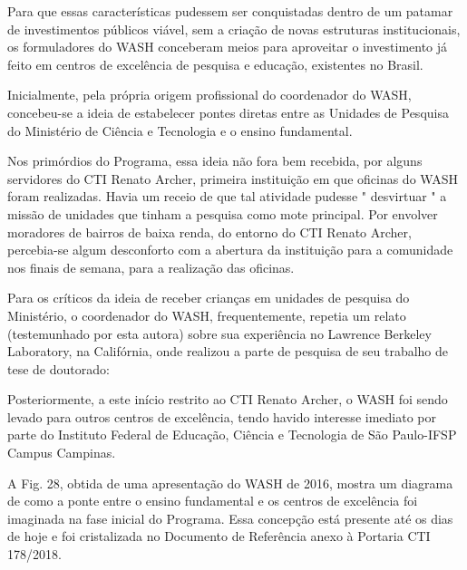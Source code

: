 Para que essas características pudessem ser conquistadas dentro de um patamar de investimentos públicos viável, sem a criação de novas estruturas institucionais, os formuladores do WASH conceberam meios para aproveitar o investimento já feito em centros de excelência de pesquisa e educação, existentes no Brasil.

Inicialmente, pela própria origem profissional do coordenador do WASH, concebeu-se a ideia de estabelecer pontes diretas entre as Unidades de Pesquisa do Ministério de Ciência e Tecnologia e o ensino fundamental.

Nos primórdios do Programa, essa ideia não fora bem recebida, por alguns servidores do CTI Renato Archer, primeira instituição em que oficinas do WASH foram realizadas. Havia um receio de que tal atividade pudesse " desvirtuar " a missão de unidades que tinham a pesquisa como mote principal. Por envolver moradores de bairros de baixa renda, do entorno do CTI Renato Archer, percebia-se algum desconforto com a abertura da instituição para a comunidade nos finais de semana, para a realização das oficinas.

Para os críticos da ideia de receber crianças em unidades de pesquisa do Ministério, o coordenador do WASH, frequentemente, repetia um relato (testemunhado por esta autora) sobre sua experiência no Lawrence Berkeley Laboratory, na Califórnia, onde realizou a parte de pesquisa de seu trabalho de tese de doutorado:


\noindent\begin{center}\mbox{\centering{}}\end{center}


Posteriormente, a este início restrito ao CTI Renato Archer, o WASH foi sendo levado para outros centros de excelência, tendo havido interesse imediato por parte do Instituto Federal de Educação, Ciência e Tecnologia de São Paulo-IFSP Campus Campinas.

A Fig. 28, obtida de uma apresentação do WASH de 2016, mostra um diagrama de como a ponte entre o ensino fundamental e os centros de excelência foi imaginada na fase inicial do Programa. Essa concepção está presente até os dias de hoje e foi cristalizada no Documento de Referência anexo à Portaria CTI 178/2018.



